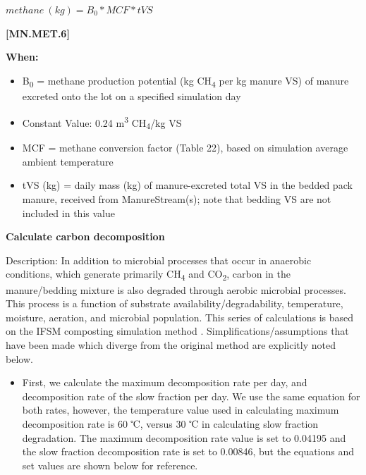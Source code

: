 \begin{refsection}
    \begin{center}
        \(methane\ (kg) = B_{0} * MCF * tVS\)
    \end{center}
        \vspace{0.5cm} 
    
            {\raggedleft \textbf{[MN.MET.6]}\par}
            \vspace{0.5cm}

    \textbf{When:}

    \begin{itemize}
        \item B\textsubscript{0} = methane production potential (kg CH\textsubscript{4} per kg manure VS) of manure excreted onto the lot on a specified simulation day
        \item Constant Value: 0.24 m\textsuperscript{3} CH\textsubscript{4}/kg VS
        \item MCF = methane conversion factor (Table 22), based on simulation average ambient temperature
        \item tVS (kg) = daily mass (kg) of manure-excreted total VS in the bedded pack manure, received from ManureStream(s); note that bedding VS are not included in this value

    \end{itemize}
            

\textbf{Calculate carbon decomposition} 
\vspace{0.2cm}

Description: In addition to microbial processes that occur in anaerobic conditions, which generate primarily CH\textsubscript{4} and CO\textsubscript{2}, carbon in the manure/bedding mixture is also degraded through aerobic microbial processes. This process is a function of substrate availability/degradability, temperature, moisture, aeration, and microbial population. This series of calculations is based on the IFSM composting simulation method \parencite{bonifacio2017a, bonifacio2017b}. Simplifications/assumptions that have been made which diverge from the original method are explicitly noted below. 
    \begin{itemize}
        \item First, we calculate the maximum decomposition rate per day, and decomposition rate of the slow fraction per day. We use the same equation for both rates, however, the temperature value used in calculating maximum decomposition rate is 60 ℃, versus 30 ℃ in calculating slow fraction degradation. The maximum decomposition rate value is set to 0.04195 and the slow fraction decomposition rate is set to 0.00846, but the equations and set values are shown below for reference.
    \vspace{0.5cm}


\end{itemize}
\end{refsection}
